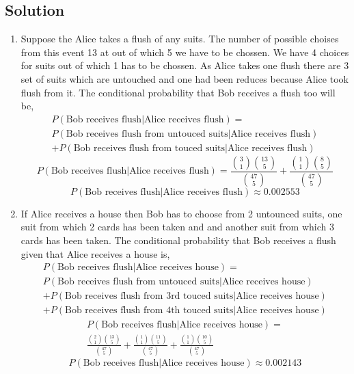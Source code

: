 \documentclass[a4paper, 11pt]{article}
\begin{document}
\subsection*{Solution}
\begin{enumerate}[label=(\alph*)]
    \item Suppose the Alice takes a flush of any suits. The number of possible choises from this event 13 at out
          of which 5 we have to be chossen. We have 4 choices for suits out of which 1 has to be chossen. As Alice
          takes one flush there are 3 set of suits which are untouched and one had been reduces because Alice took
          flush from it. The conditional probability that Bob receives a flush too will be,
          \begin{multline*}
              P(\text{Bob receives flush}|\text{Alice receives flush})=
              \\P(\text{Bob receives flush from untouced suits}|\text{Alice receives flush})
              \\+P(\text{Bob receives flush from touced suits}|\text{Alice receives flush})
          \end{multline*}
          \[P(\text{Bob receives flush}|\text{Alice receives flush})= \frac{\binom{3}{1}\binom{13}{5}}{\binom{47}{5}}
              +\frac{\binom{1}{1}\binom{8}{5}}{\binom{47}{5}}\]
          \[P(\text{Bob receives flush}|\text{Alice receives flush})\approx0.002553\]
    \item If Alice receives a house then Bob has to choose from 2 untounced suits, one suit from which 2 cards has
          been taken and and another suit from which 3 cards has been taken. The conditional probability that Bob
          receives a flush given that Alice receives a house is,
          \begin{multline*}
              P(\text{Bob receives flush}|\text{Alice receives house})=
              \\P(\text{Bob receives flush from untouced suits}|\text{Alice receives house})
              \\+P(\text{Bob receives flush from 3rd touced suits}|\text{Alice receives house})
              \\+P(\text{Bob receives flush from 4th touced suits}|\text{Alice receives house})
          \end{multline*}
          \begin{multline*}
              P(\text{Bob receives flush}|\text{Alice receives house})=
              \\\frac{\binom{2}{1}\binom{13}{5}}{\binom{47}{5}}
              +\frac{\binom{1}{1}\binom{11}{5}}{\binom{47}{5}}
              +\frac{\binom{1}{1}\binom{10}{5}}{\binom{47}{5}}
          \end{multline*}
          \[P(\text{Bob receives flush}|\text{Alice receives house})\approx0.002143\]

\end{enumerate}
\end{document}
